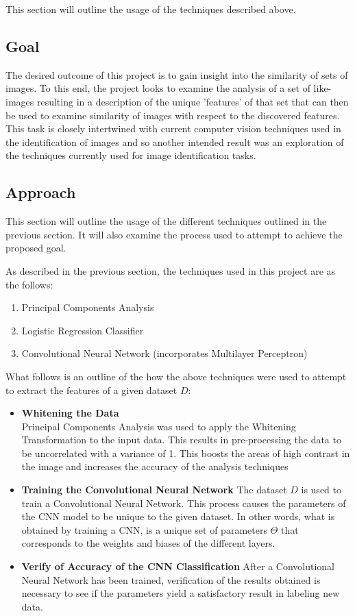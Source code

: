 \documentclass[12pt, titlepage]{article}
\begin{document}
This section will outline the usage of the techniques described above.

\subsection{Goal}

The desired outcome of this project is to gain insight into the similarity of sets of images. To this end, the project
looks to examine the analysis of a set of like-images resulting in a description of the unique 'features' of that set that
can then be used to examine similarity of images with respect to the discovered features. This task is closely intertwined
with current computer vision techniques used in the identification of images and so another intended result was an exploration
of the techniques currently used for image identification tasks.
  
\subsection{Approach}

This section will outline the usage of the different techniques outlined in the previous section. It will also examine the
process used to attempt to achieve the proposed goal.

As described in the previous section, the techniques used in this project are as the follows:
\begin{enumerate}
  \item Principal Components Analysis
  \item Logistic Regression Classifier
  \item Convolutional Neural Network (incorporates Multilayer Perceptron)
\end{enumerate}

What follows is an outline of the how the above techniques were used to attempt to extract the features of a given dataset $D$:
\begin{itemize}
  \item \textbf{Whitening the Data} \\
        Principal Components Analysis was used to apply the Whitening Transformation to the input data. This results in
        pre-processing the data to be uncorrelated with a variance of 1. This boosts the areas of high contrast in the image
        and increases the accuracy of the analysis techniques

  \item \textbf{Training the Convolutional Neural Network}
  		The dataset $D$ is used to train a Convolutional Neural Network. This process causes the parameters of the CNN model
  		to be unique to the given dataset. In other words, what is obtained by training a CNN, is a unique set of parameters
  		$\Theta$ that corresponds to the weights and biases of the different layers.
  		
  \item \textbf{Verify of Accuracy of the CNN Classification}
  		After a Convolutional Neural Network has been trained, verification of the results obtained is necessary to see if the
  		parameters yield a satisfactory result in labeling new data. 
\end{itemize}
\end{document}
